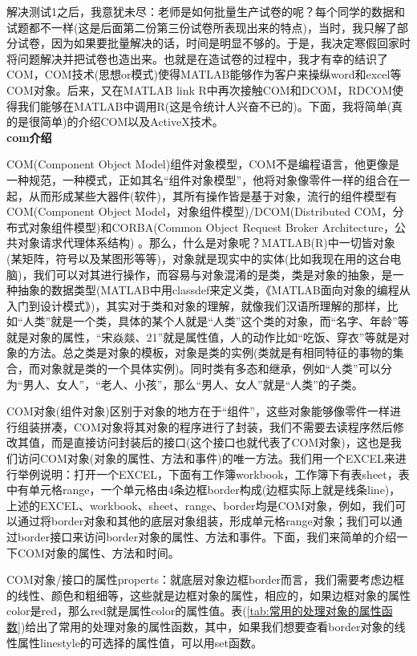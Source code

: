             \par
            解决测试1之后，我意犹未尽：老师是如何批量生产试卷的呢？每个同学的数据和试题都不一样(这是后面第二份第三份试卷所表现出来的特点)，当时，我只解了部分试卷，因为如果要批量解决的话，时间是明显不够的。于是，我决定寒假回家时将问题解决并把试卷也造出来。也就是在造试卷的过程中，我才有幸的结识了COM，COM技术(思想or模式)使得MATLAB能够作为客户来操纵word和excel等COM对象。后来，又在MATLAB link R中再次接触COM和DCOM，RDCOM使得我们能够在MATLAB中调用R(这是令统计人兴奋不已的)。下面，我将简单(真的是很简单)的介绍COM以及ActiveX技术。\\
            \textbf{com介绍}
            \par
            COM(Component Object Model)组件对象模型，COM不是编程语言，他更像是一种规范，一种模式，正如其名“组件对象模型”，他将对象像零件一样的组合在一起，从而形成某些大器件(软件)，其所有操作皆是基于对象，流行的组件模型有COM(Component Object Model，对象组件模型)/DCOM(Distributed COM，分布式对象组件模型)和CORBA(Common Object Request Broker Architecture，公共对象请求代理体系结构) 。那么，什么是对象呢？MATLAB(R)中一切皆对象(某矩阵，符号以及某图形等等)，对象就是现实中的实体(比如我现在用的这台电脑)，我们可以对其进行操作，而容易与对象混淆的是类，类是对象的抽象，是一种抽象的数据类型(MATLAB中用classdef来定义类，《MATLAB面向对象的编程从入门到设计模式》)，其实对于类和对象的理解，就像我们汉语所理解的那样，比如“人类”就是一个类，具体的某个人就是“人类”这个类的对象，而“名字、年龄”等就是对象的属性，“宋焱燚、21”就是属性值，人的动作比如“吃饭、穿衣”等就是对象的方法。总之类是对象的模板，对象是类的实例(类就是有相同特征的事物的集合，而对象就是类的一个具体实例)。同时类有多态和继承，例如“人类”可以分为“男人、女人”，“老人、小孩”，那么“男人、女人”就是“人类”的子类。
            \par
            COM对象(组件对象)区别于对象的地方在于“组件”，这些对象能够像零件一样进行组装拼凑，COM对象将其对象的程序进行了封装，我们不需要去读程序然后修改其值，而是直接访问封装后的接口(这个接口也就代表了COM对象)，这也是我们访问COM对象(对象的属性、方法和事件)的唯一方法。我们用一个EXCEL来进行举例说明：打开一个EXCEL，下面有工作簿workbook，工作簿下有表sheet，表中有单元格range，一个单元格由4条边框border构成(边框实际上就是线条line)，上述的EXCEL、workbook、sheet、range、border均是COM对象，例如，我们可以通过将border对象和其他的底层对象组装，形成单元格range对象；我们可以通过border接口来访问border对象的属性、方法和事件。下面，我们来简单的介绍一下COM对象的属性、方法和时间。
            \par
            COM对象/接口的属性properts：就底层对象边框border而言，我们需要考虑边框的线性、颜色和粗细等，这些就是边框对象的属性，相应的，如果边框对象的属性color是red，那么red就是属性color的属性值。表(\ref{tab:常用的处理对象的属性函数})给出了常用的处理对象的属性函数，其中，如果我们想要查看border对象的线性属性linestyle的可选择的属性值，可以用set函数。
